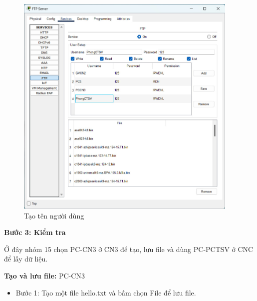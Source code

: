 \documentclass[12pt, a4paper]{article}
\begin{document}
\begin{flushleft}
\begin{itemize}[leftmargin=0.75cm]
\begin{figure}[H]
				\centering
				\includegraphics[width=0.95\textwidth]{ftp_config.jpg}
				\caption{Tạo tên người dùng}
			\end{figure}
		\end{itemize}
		\newpage
		\textbf{Bước 3: Kiểm tra}\\
		\begin{flushleft}
		Ở đây nhóm 15 chọn PC-CN3 ở CN3 để tạo, lưu file và dùng PC-PCTSV ở CNC để lấy dữ liệu.\\
		\end{flushleft}
		\textbf{Tạo và lưu file:} PC-CN3\\
		\begin{itemize}[leftmargin=0.75cm]
			\item Bước 1: Tạo một file hello.txt và bấm chọn File để lưu file.
			\begin{figure}[H]
				\centering

\end{figure}
\end{itemize}
\end{flushleft}
\end{document}
